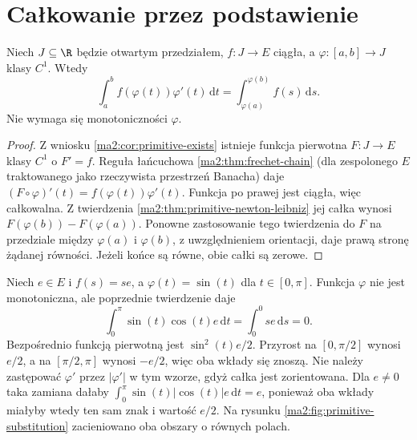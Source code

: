 \section{Całkowanie przez podstawienie}

\begin{twierdzenie}
\label{ma2:thm:primitive-substitution}
Niech $J\subseteq\R$ będzie otwartym
przedziałem, $f:J\to E$ ciągła,
a $\varphi:[a,b]\to J$ klasy $C^1$.
Wtedy
\[
 \int_a^b f(\varphi(t))\varphi'(t)\,\mathrm dt
 =\int_{\varphi(a)}^{\varphi(b)}f(s)\,\mathrm ds.
\]
Nie wymaga się monotoniczności $\varphi$.
\end{twierdzenie}
\begin{proof}
Z wniosku \ref{ma2:cor:primitive-exists}
istnieje funkcja pierwotna $F:J\to E$
klasy $C^1$ o $F'=f$.
Reguła łańcuchowa
\ref{ma2:thm:frechet-chain} (dla
zespolonego $E$ traktowanego jako
rzeczywista przestrzeń Banacha) daje
$(F\circ\varphi)'(t)=f(\varphi(t))\varphi'(t)$.
Funkcja po prawej jest ciągła, więc
całkowalna. Z twierdzenia
\ref{ma2:thm:primitive-newton-leibniz}
jej całka wynosi $F(\varphi(b))-F(\varphi(a))$.
Ponowne zastosowanie tego twierdzenia
do $F$ na przedziale między $\varphi(a)$
i $\varphi(b)$, z uwzględnieniem orientacji,
daje prawą stronę żądanej równości.
Jeżeli końce są równe, obie całki są zerowe.
\end{proof}

\begin{przyklad}
\label{ma2:ex:primitive-nonmonotone}
Niech $e\in E$ i $f(s)=se$, a
$\varphi(t)=\sin(t)$ dla $t\in[0,\pi]$.
Funkcja $\varphi$ nie jest monotoniczna,
ale poprzednie twierdzenie daje
\[
 \int_0^\pi \sin(t)\cos(t)e\,\mathrm dt
 =\int_0^0 se\,\mathrm ds=0.
\]
Bezpośrednio funkcją pierwotną jest
$\sin^2(t)e/2$. Przyrost na $[0,\pi/2]$
wynosi $e/2$, a na $[\pi/2,\pi]$ wynosi
$-e/2$, więc oba wkłady się znoszą.
Nie należy zastępować $\varphi'$ przez
$|\varphi'|$ w tym wzorze, gdyż całka
jest zorientowana. Dla $e\ne0$ taka
zamiana dałaby
$\int_0^\pi\sin(t)|\cos(t)|e\,\mathrm dt=e$,
ponieważ oba wkłady miałyby wtedy
ten sam znak i wartość $e/2$.
Na rysunku \ref{ma2:fig:primitive-substitution}
zacieniowano oba obszary o równych polach.
\end{przyklad}

